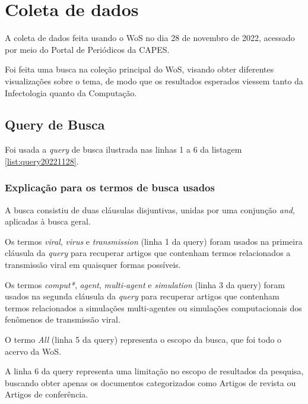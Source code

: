 \section{Coleta de dados}\label{Virus@mutenesss:coleta}

A coleta de dados feita usando o WoS no dia 28 de novembro de 2022, acessado por meio do Portal de Periódicos da CAPES.

Foi feita uma busca na coleção principal do WoS, visando obter diferentes visualizações sobre o tema, de modo que os resultados esperados viessem tanto da Infectologia quanto da Computação.  


\subsection{Query de Busca}\label{Virus@mutenesss:query}

Foi usada a \textit{query}  de busca ilustrada nas linhas 1 a 6 da listagem \ref{list:query20221128}.

 \label{list:query20221128}

\subsubsection{Explicação para os termos de busca usados}\label{Virus@mutenesss:busca}

A busca consistiu de duas cláusulas disjuntivas, unidas por uma conjunção \textit{and}, aplicadas à busca geral.

Os termos \textit{viral}, \textit{virus} e \textit{transmission} (linha 1 da query) foram usados na primeira cláusula da \textit{query}  para recuperar artigos que contenham termos relacionados a transmissão viral em quaisquer formas possíveis.

Os termos \textit{comput*}, \textit{agent}, \textit{multi-agent} e \textit{simulation} (linha 3 da query) foram usados na segunda cláusula da \textit{query} para recuperar artigos que contenham termos relacionados a simulações multi-agentes ou simulações computacionais dos fenômenos de transmissão viral.

O termo \textit{All} (linha 5 da query) representa o escopo da busca, que foi todo o acervo da WoS.

A linha 6 da query representa uma limitação no escopo de resultados da pesquisa, buscando obter apenas os documentos categorizados como Artigos de revista ou Artigos de conferência.

